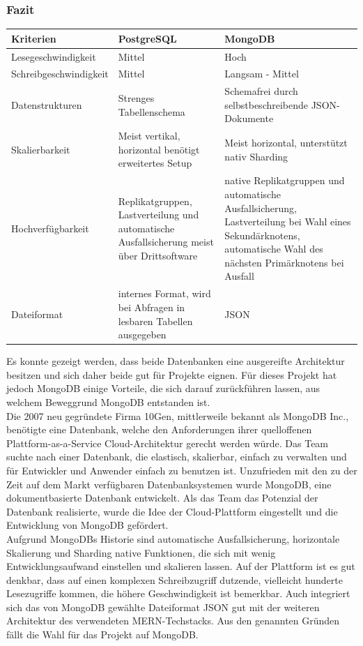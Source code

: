 \subsubsection{Fazit}
\begin{center}
    \begin{tabularx}{\linewidth}{ |X|X|X| } 
        \hline
        Kriterien & PostgreSQL & MongoDB  \\ 
        \hline
        Lesegeschwindigkeit & Mittel & Hoch \\
        Schreibgeschwindigkeit & Mittel & Langsam - Mittel \\
        Datenstrukturen & Strenges Tabellenschema & Schemafrei durch selbstbeschreibende JSON-Dokumente \\
        Skalierbarkeit & Meist vertikal, horizontal benötigt erweitertes Setup & Meist horizontal, unterstützt nativ Sharding \\
        Hochverfügbarkeit & Replikatgruppen, Lastverteilung und automatische Ausfallsicherung meist über Drittsoftware & native Replikatgruppen und automatische Ausfallsicherung, Lastverteilung bei Wahl eines Sekundärknotens, automatische Wahl des nächsten Primärknotens bei Ausfall \\
        Dateiformat & internes Format, wird bei Abfragen in lesbaren Tabellen ausgegeben & JSON \\
        \hline
    \end{tabularx}
\end{center}

Es konnte gezeigt werden, dass beide Datenbanken eine ausgereifte Architektur besitzen und sich daher beide gut für Projekte eignen. Für dieses Projekt hat jedoch MongoDB einige Vorteile, die sich darauf zurückführen lassen, aus welchem Beweggrund MongoDB entstanden ist.\\
Die 2007 neu gegründete Firma 10Gen, mittlerweile bekannt als MongoDB Inc., benötigte eine Datenbank, welche den Anforderungen ihrer quelloffenen Plattform-as-a-Service Cloud-Architektur gerecht werden würde. Das Team suchte nach einer Datenbank, die elastisch, skalierbar, einfach zu verwalten und für Entwickler und Anwender einfach zu benutzen ist. Unzufrieden mit den zu der Zeit auf dem Markt verfügbaren Datenbanksystemen wurde MongoDB, eine dokumentbasierte Datenbank entwickelt. Als das Team das Potenzial der Datenbank realisierte, wurde die Idee der Cloud-Plattform eingestellt und die Entwicklung von MongoDB gefördert.\cite{MG9}\\
Aufgrund MongoDBs Historie sind automatische Ausfallsicherung, horizontale Skalierung und Sharding native Funktionen, die sich mit wenig Entwicklungsaufwand einstellen und skalieren lassen. Auf der Plattform ist es gut denkbar, dass auf einen komplexen Schreibzugriff dutzende, vielleicht hunderte Lesezugriffe kommen, die höhere Geschwindigkeit ist bemerkbar. Auch integriert sich das von MongoDB gewählte Dateiformat JSON gut mit der weiteren Architektur des verwendeten MERN-Techstacks.
Aus den genannten Gründen fällt die Wahl für das Projekt auf MongoDB.


